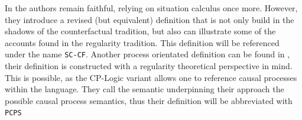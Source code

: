 \documentclass[11pt,a4paper]{book}
\theoremstyle{definition}
\theoremstyle{definition}
\theoremstyle{definition}
\theoremstyle{remark}
\begin{document}
In \parencite{khannecessary} the authors remain faithful, relying on situation calculus once more. However, they introduce a revised (but equivalent) definition that is not only build in the shadows of the counterfactual tradition, but also can illustrate some of the accounts found in the regularity tradition. This definition will be referenced under the name \texttt{SC-CF}.
% 
Another process orientated definition can be found in \parencite{denecker2018causal,denecker2019explaining}, their definition is constructed with a regularity theoretical perspective in mind. This is possible, as the CP-Logic variant allows one to reference causal processes within the language. They call the semantic underpinning their approach the possible causal process semantics, thus their definition will be abbreviated with \texttt{PCPS}
\end{document}
